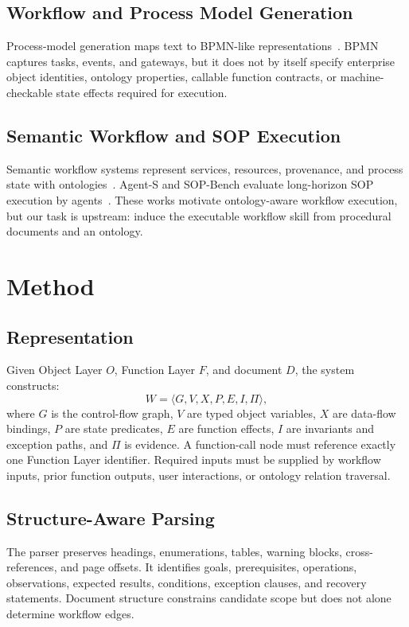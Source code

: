 \documentclass[10pt,twocolumn]{article}
\begin{document}
\subsection{Workflow and Process Model Generation}
Process-model generation maps text to BPMN-like representations~\cite{kourani2024processmodeling}. BPMN captures tasks, events, and gateways, but it does not by itself specify enterprise object identities, ontology properties, callable function contracts, or machine-checkable state effects required for execution.

\subsection{Semantic Workflow and SOP Execution}
Semantic workflow systems represent services, resources, provenance, and process state with ontologies~\cite{kaefer2018linkedworkflows,norouzi2025processodp}. Agent-S and SOP-Bench evaluate long-horizon SOP execution by agents~\cite{kulkarni2025agents,nandi2025sopbench}. These works motivate ontology-aware workflow execution, but our task is upstream: induce the executable workflow skill from procedural documents and an ontology.

\section{Method}
\subsection{Representation}
Given Object Layer $O$, Function Layer $F$, and document $D$, the system constructs:
\[
W=\langle G,V,X,P,E,I,\Pi\rangle,
\]
where $G$ is the control-flow graph, $V$ are typed object variables, $X$ are data-flow bindings, $P$ are state predicates, $E$ are function effects, $I$ are invariants and exception paths, and $\Pi$ is evidence. A function-call node must reference exactly one Function Layer identifier. Required inputs must be supplied by workflow inputs, prior function outputs, user interactions, or ontology relation traversal.

\subsection{Structure-Aware Parsing}
The parser preserves headings, enumerations, tables, warning blocks, cross-references, and page offsets. It identifies goals, prerequisites, operations, observations, expected results, conditions, exception clauses, and recovery statements. Document structure constrains candidate scope but does not alone determine workflow edges.
\end{document}
